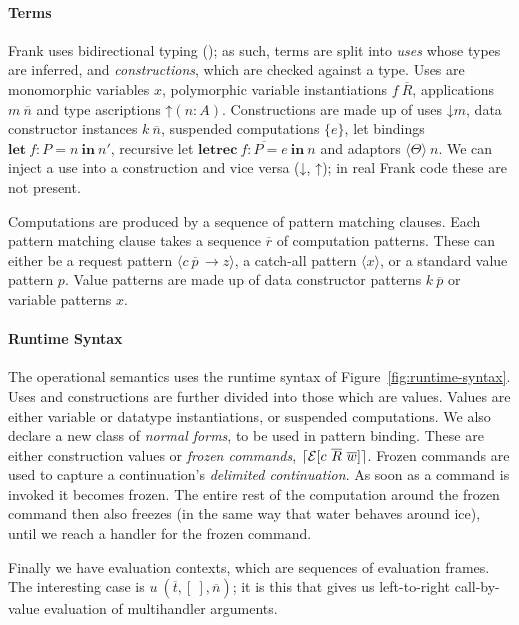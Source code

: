 \documentclass[msc,deptreport,cs]{infthesis} %
\DeclarePairedDelimiter{\ceil}{\lceil}{\rceil}
\newcommand{\many}{\overline}
\newcommand{\adapt}{\Theta}
\newcommand{\key}[1]{\mathbf{#1}} %
\newcommand{\handleSymbol}{\rightarrow}
\newcommand{\handle}[2]{{#1} \handleSymbol {#2}}
\newcommand{\thunk}[1]{\{{#1}\}}
\newcommand{\effin}[1]{\langle {#1} \rangle}
\newcommand{\EC}{\mathcal{E}}
\newcommand{\freeze}{\ceil}
\newcommand{\uc}{\mathord{\downarrow}}
\newcommand{\cu}{\mathord{\uparrow}}
\begin{document}
\paragraph*{Terms} Frank uses bidirectional typing (\cite{pierce2000local}); as such, terms are
split into \emph{uses} whose types are inferred, and \emph{constructions}, which
are checked against a type. Uses are monomorphic variables $x$, polymorphic
variable instantiations $f~\many{R}$, applications $m~\many{n}$ and type
ascriptions $\cu(n:A)$. Constructions are made up of uses $\uc m$, data
constructor instances $k~\many{n}$, suspended computations $\thunk{e}$, let
bindings $\key{let}~f : P = n~\key{in}~n'$, recursive let $\key{letrec}~\many{f
  : P = e}~\key{in}~n$ and adaptors $\effin{\adapt}~n$. We can inject a use into
a construction and vice versa ($\uc$, $\cu$); in real Frank code these are not
present.

Computations are produced by a sequence of pattern matching clauses. Each
pattern matching clause takes a sequence $\many{r}$ of computation patterns.
These can either be a request pattern $\effin{\handle{c~\many{p}\,}{z}}$, a
catch-all pattern $\effin{x}$, or a standard value pattern $p$. Value patterns
are made up of data constructor patterns $k~\many{p}$ or variable patterns $x$.

\paragraph*{Runtime Syntax}

The operational semantics uses the runtime syntax of
Figure~\ref{fig:runtime-syntax}.
%
Uses and constructions are further divided into those which are values. Values
are either variable or datatype instantiations, or suspended computations.
%
We also declare a new class of \emph{normal forms}, to be used in pattern
binding. These are either construction values or \emph{frozen commands},
$\freeze{\EC[c~\many{R}~\many{w}]}$.
%
Frozen commands are used to capture a continuation's \emph{delimited
  continuation}. As soon as a command is invoked it becomes frozen. The entire
rest of the computation around the frozen command then also freezes (in the same
way that water behaves around ice), until we reach a handler for the frozen
command.

Finally we have evaluation contexts, which are sequences of evaluation frames.
The interesting case is $u~(\many{t}, [~],\many{n})$; it is this that gives us
left-to-right call-by-value evaluation of multihandler arguments.
\end{document}
